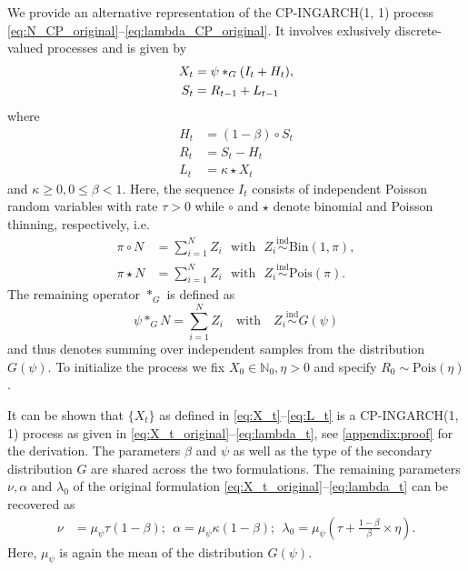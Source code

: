 \documentclass[review]{elsarticle}
\begin{document}
We provide an alternative representation of the CP-INGARCH(1, 1) process \eqref{eq:N_CP_original}--\eqref{eq:lambda_CP_original}. It involves exlusively discrete-valued processes and is given by
\begin{align}
X_t & = \psi *_G (I_t + H_t),\label{eq:X_t}\\
S_t & = R_{t - 1} + L_{t - 1}\label{eq:juv_t}
\end{align}
where
\begin{align}
H_t & = (1 - \beta) \circ S_t\\
R_t & = S_t - H_t \label{eq:R_t}\\
L_t & = \kappa \star X_t \label{eq:L_t}
\end{align}
and $\kappa \geq 0, 0 \leq \beta <1$. Here, the sequence $I_t$ consists of independent Poisson random variables with rate $\tau > 0$ while $\circ$ and $\star$ denote binomial and Poisson thinning, respectively, i.e.\
\begin{align*}
\pi \circ N & = \sum_{i = 1}^N Z_i \ \ \ \text{with} \ \ \ Z_i \stackrel{\text{ind}}{\sim} \text{Bin}(1, \pi), \\
\pi \star N & = \sum_{i = 1}^N Z_i \ \ \ \text{with} \ \ \ Z_i \stackrel{\text{ind}}{\sim} \text{Pois}(\pi).
\end{align*}
The remaining operator $*_G$ is defined as
$$
\psi *_G N = \sum_{i = 1}^N Z_i \ \ \ \text{ with } \ \ \ Z_i \stackrel{\text{ind}}{\sim} G(\psi)
$$
and thus denotes summing over independent samples from the distribution $G(\psi)$. To initialize the process we fix $X_0 \in \mathbb{N}_0, \eta > 0$ and specify $R_0 \sim \text{Pois}\left(\eta \right)$.

It can be shown that $\{X_t\}$ as defined in \eqref{eq:X_t}--\eqref{eq:L_t} is a CP-INGARCH(1, 1) process as given in \eqref{eq:X_t_original}--\eqref{eq:lambda_t}, see \ref{appendix:proof} for the derivation. The parameters $\beta$ and $\psi$ as well as the type of the secondary distribution $G$ are shared across the two formulations. The remaining parameters $\nu, \alpha$ and $\lambda_0$ of the original formulation \eqref{eq:X_t_original}--\eqref{eq:lambda_t} can be recovered as
\begin{align*}
\nu & = \mu_\psi \tau(1 - \beta); \ \
\alpha = \mu_\psi \kappa(1 - \beta); \ \
\lambda_0 = \mu_\psi \left(\tau + \frac{1 - \beta}{\beta} \times \eta\right).
\end{align*}
Here, $\mu_\psi$ is again the mean of the distribution $G(\psi)$. 
\end{document}
